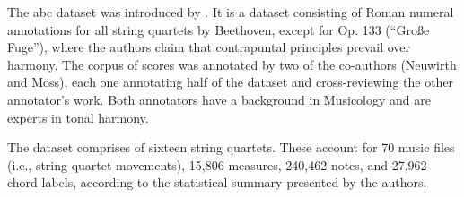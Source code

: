 
The \gls{abc} dataset was introduced by
\textcite{neuwirth2018annotated}. It is a dataset consisting
of Roman numeral annotations for all string quartets by
Beethoven, except for Op. 133 (``Gro{\ss}e Fuge''), where
the authors claim that contrapuntal principles prevail over
harmony. The corpus of scores was annotated by two of the
co-authors (Neuwirth and Moss), each one annotating half of
the dataset and cross-reviewing the other annotator's work.
Both annotators have a background in Musicology and are
experts in tonal harmony.

The dataset comprises of sixteen string quartets. These
account for 70 music files (i.e., string quartet movements),
15,806 measures, 240,462 notes, and 27,962 chord labels,
according to the statistical summary presented by the
authors.
